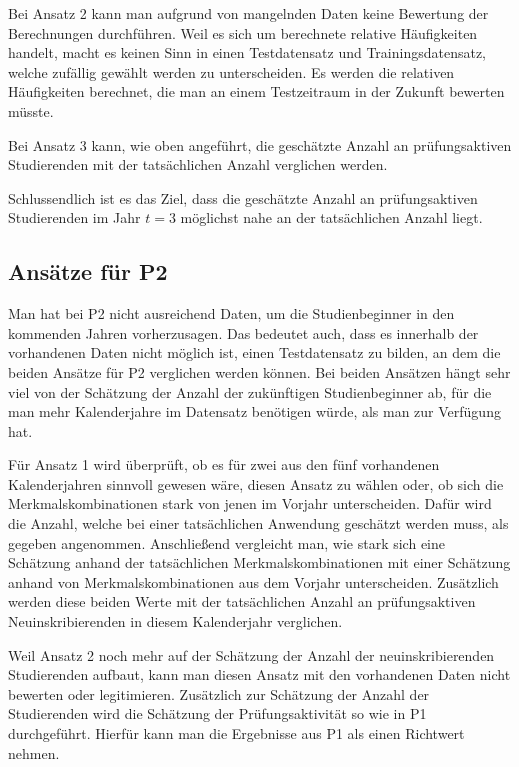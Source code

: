 Bei Ansatz 2 kann man aufgrund von mangelnden Daten keine Bewertung der Berechnungen durchf\"uhren. Weil es sich um berechnete relative H\"aufigkeiten
handelt, macht es keinen Sinn in einen Testdatensatz und Trainingsdatensatz, welche zuf\"allig gew\"ahlt werden zu unterscheiden. Es werden die relativen
H\"aufigkeiten berechnet, die man an einem Testzeitraum in der Zukunft bewerten m\"usste.

Bei Ansatz 3 kann, wie oben angef\"uhrt, die gesch\"atzte Anzahl an pr\"ufungsaktiven Studierenden mit der tats\"achlichen Anzahl verglichen werden.

Schlussendlich ist es das Ziel, dass die gesch\"atzte Anzahl an pr\"ufungsaktiven Studierenden im Jahr $t = 3$ m\"oglichst nahe an der tats\"achlichen Anzahl
liegt.

\subsection{Ans\"atze f\"ur P2}
Man hat bei P2 nicht ausreichend Daten, um die Studienbeginner in den kommenden Jahren  vorherzusagen. Das bedeutet auch, dass es innerhalb der vorhandenen
Daten nicht m\"oglich ist, einen Testdatensatz zu bilden, an dem die beiden Ans\"atze f\"ur P2 verglichen werden k\"onnen. Bei beiden Ans\"atzen h\"angt
sehr viel von der Sch\"atzung der Anzahl der zuk\"unftigen Studienbeginner ab, f\"ur die man mehr Kalenderjahre im Datensatz ben\"otigen w\"urde, als
man zur Verf\"ugung hat.

F\"ur Ansatz 1 wird \"uberpr\"uft, ob es f\"ur zwei aus den f\"unf vorhandenen Kalenderjahren sinnvoll gewesen w\"are, diesen Ansatz zu w\"ahlen oder, ob sich die
Merkmalskombinationen stark von jenen im Vorjahr unterscheiden. Daf\"ur wird die Anzahl, welche bei einer tats\"achlichen Anwendung gesch\"atzt werden muss,
als gegeben angenommen. Anschlie{\ss}end vergleicht man, wie stark sich eine Sch\"atzung anhand der tats\"achlichen Merkmalskombinationen mit einer Sch\"atzung anhand von
Merkmalskombinationen aus dem Vorjahr unterscheiden. Zus\"atzlich werden diese beiden Werte mit der tats\"achlichen Anzahl an pr\"ufungsaktiven Neuinskribierenden
in diesem Kalenderjahr verglichen.

Weil Ansatz 2 noch mehr auf der Sch\"atzung der Anzahl der neuinskribierenden Studierenden aufbaut, kann man diesen Ansatz mit den vorhandenen Daten nicht bewerten oder legitimieren.
Zus\"atzlich zur Sch\"atzung der Anzahl der Studierenden wird die Sch\"atzung der Pr\"ufungsaktivit\"at so wie in P1 durchgef\"uhrt. Hierf\"ur kann man die
Ergebnisse aus P1 als einen Richtwert nehmen.
